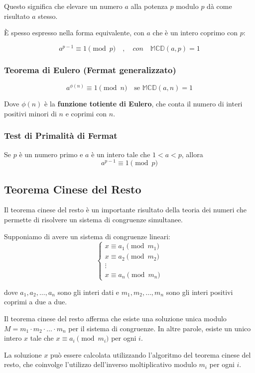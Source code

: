 \documentclass[a4paper,12pt]{report}
\begin{document}
Questo significa che elevare un numero $a$ alla potenza $p$ modulo $p$ dà come risultato $a$ stesso.

È spesso espresso nella forma equivalente, con \(a\) che è un intero coprimo con \(p\):

\[a^{p-1} \equiv 1 \pmod{p}\quad,\quad con\quad \mathbb{MCD}(a,p)=1\]

\subsubsection*{Teorema di Eulero (Fermat generalizzato)}

$$a^{\phi(n)} \equiv 1 \pmod{n} \quad \text{se } \mathbb{MCD}(a,n) = 1$$

Dove $\phi(n)$ è la \textbf{funzione totiente di Eulero}, che conta il numero di interi positivi minori di $n$ e coprimi con $n$.

\subsubsection*{Test di Primalità di Fermat} \label{sec:fermat}
Se $p$ è un numero primo e $a$ è un intero tale che $1 < a < p$, allora
\[a^{p-1} \equiv 1 \pmod{p}\]

\subsection*{Teorema Cinese del Resto} \label{sec:cinese}
Il teorema cinese del resto è un importante risultato della teoria dei numeri che permette di risolvere un sistema di congruenze simultanee. 

Supponiamo di avere un sistema di congruenze lineari:
\[\begin{cases}
x \equiv a_1 \pmod{m_1} \\
x \equiv a_2 \pmod{m_2} \\
\vdots \\
x \equiv a_n \pmod{m_n}
\end{cases}\]

dove $a_1, a_2, \ldots, a_n$ sono gli interi dati e $m_1, m_2, \ldots, m_n$ sono gli interi positivi coprimi a due a due.

Il teorema cinese del resto afferma che esiste una soluzione unica modulo $M = m_1 \cdot m_2 \cdot \ldots \cdot m_n$ per il sistema di congruenze. In altre parole, esiste un unico intero $x$ tale che $x \equiv a_i \pmod{m_i}$ per ogni $i$.

La soluzione $x$ può essere calcolata utilizzando l'algoritmo del teorema cinese del resto, che coinvolge l'utilizzo dell'inverso moltiplicativo modulo $m_i$ per ogni $i$.
\end{document}

